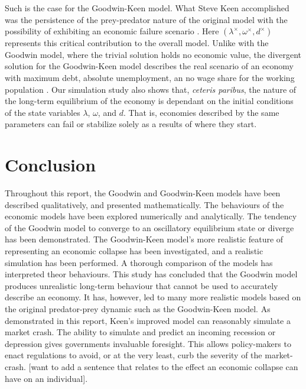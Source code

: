 \documentclass[12pt, centerh1]{article}
\begin{document}
Such is the case for the Goodwin-Keen model. What Steve Keen accomplished was the persistence of the prey-predator nature of the original model with the possibility of exhibiting an economic failure scenario \citep{keen1995finance}. Here $(\lambda^\times, \omega^\times, d^\times)$ represents this critical contribution to the overall model. Unlike with the Goodwin model, where the trivial solution holds no economic value, the divergent solution for the Goodwin-Keen model describes the real scenario of an economy with maximum debt, absolute unemployment, an no wage share for the working population \citep{minsky1992financial}. Our simulation study also shows that, \emph{ceteris paribus}, the nature of the long-term equilibrium of the economy is dependant on the initial conditions of the state variables $\lambda$, $\omega$, and $d$. That is, economies described by the same parameters can fail or stabilize solely as a results of where they start.


\section{Conclusion}
Throughout this report, the Goodwin and Goodwin-Keen models have been described qualitatively, and presented mathematically. The behaviours of the economic models have been explored numerically and analytically. The tendency of the Goodwin model to converge to an oscillatory equilibrium state or diverge has been demonstrated. The Goodwin-Keen model's more realistic feature of representing an economic collapse has been investigated, and a realistic simulation has been performed. A thorough comparison of the models has interpreted theor behaviours. This study has concluded that the Goodwin model produces unrealistic long-term behaviour that cannot be used to accurately describe an economy. It has, however, led to many more realistic models based on the original predator-prey dynamic such as the Goodwin-Keen model. As demonstrated in this report, Keen's improved model can reasonably simulate a market crash. The ability to simulate and predict an incoming recession or depression gives governments invaluable foresight. This allows policy-makers to enact regulations to avoid, or at the very least, curb the severity of the market-crash. [want to add a sentence that relates to the effect an economic collapse can have on an individual].
\end{document}
